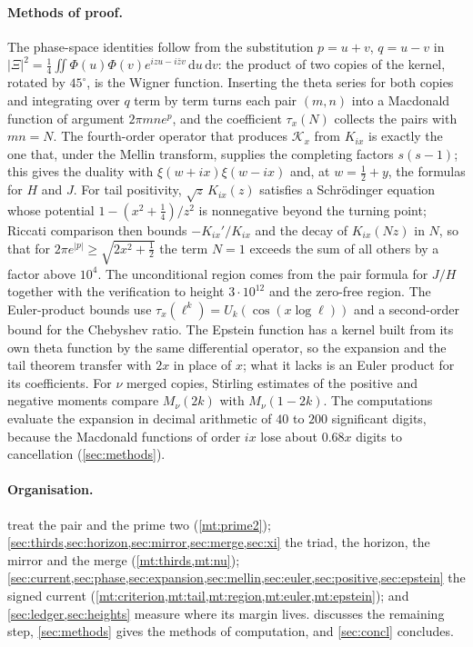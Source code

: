 \documentclass[11pt]{article}
\theoremstyle{definition}\newtheorem{definition}[theorem]{Definition}
\theoremstyle{remark}\newtheorem{remark}[theorem]{Remark}
\newcommand{\dd}{\,\mathrm d}\newcommand{\e}{\mathrm e}
\begin{document}
\paragraph{Methods of proof.} The phase-space identities follow from the substitution $p=u+v$, $q=u-v$ in $|\Xi|^2=\frac14\iint\Phi(u)\Phi(v)e^{izu-i\bar zv}\dd u\dd v$: the product of two copies of the kernel, rotated by $45^\circ$, is the Wigner function. Inserting the theta series for both copies and integrating over $q$ term by term turns each pair $(m,n)$ into a Macdonald function of argument $2\pi mne^p$, and the coefficient $\tau_x(N)$ collects the pairs with $mn=N$. The fourth-order operator that produces $\mathcal K_x$ from $K_{ix}$ is exactly the one that, under the Mellin transform, supplies the completing factors $s(s-1)$; this gives the duality with $\xi(w+ix)\xi(w-ix)$ and, at $w=\frac12+y$, the formulas for $H$ and $J$. For tail positivity, $\sqrt z\,K_{ix}(z)$ satisfies a Schr\"odinger equation whose potential $1-(x^2+\frac14)/z^2$ is nonnegative beyond the turning point; Riccati comparison then bounds $-K_{ix}'/K_{ix}$ and the decay of $K_{ix}(Nz)$ in $N$, so that for $2\pi e^{|p|}\ge\sqrt{2x^2+\frac12}$ the term $N=1$ exceeds the sum of all others by a factor above $10^4$. The unconditional region comes from the pair formula for $J/H$ together with the verification to height $3\cdot10^{12}$ and the zero-free region. The Euler-product bounds use $\tau_x(\ell^k)=U_k(\cos(x\log\ell))$ and a second-order bound for the Chebyshev ratio. The Epstein function has a kernel built from its own theta function by the same differential operator, so the expansion and the tail theorem transfer with $2x$ in place of $x$; what it lacks is an Euler product for its coefficients. For $\nu$ merged copies, Stirling estimates of the positive and negative moments compare $M_\nu(2k)$ with $M_\nu(1-2k)$. The computations evaluate the expansion in decimal arithmetic of $40$ to $200$ significant digits, because the Macdonald functions of order $ix$ lose about $0.68x$ digits to cancellation (\cref{sec:methods}).

\paragraph{Organisation.}  treat the pair and the prime two (\cref{mt:prime2}); \cref{sec:thirds,sec:horizon,sec:mirror,sec:merge,sec:xi} the triad, the horizon, the mirror and the merge (\cref{mt:thirds,mt:nu}); \cref{sec:current,sec:phase,sec:expansion,sec:mellin,sec:euler,sec:positive,sec:epstein} the signed current (\cref{mt:criterion,mt:tail,mt:region,mt:euler,mt:epstein}); and \cref{sec:ledger,sec:heights} measure where its margin lives.  discusses the remaining step, \cref{sec:methods} gives the methods of computation, and \cref{sec:concl} concludes.
\end{document}
